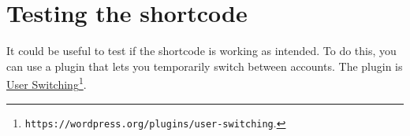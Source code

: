 \documentclass[a4paper,11pt]{article}
\begin{document}
\section{Testing the shortcode}

It could be useful to test if the shortcode is working as intended. To do this, you can use a plugin that lets you temporarily switch between accounts. The plugin is \href{https://wordpress.org/plugins/user-switching}{User Switching}\footnote{\texttt{https://wordpress.org/plugins/user-switching}.}.
\end{document}
